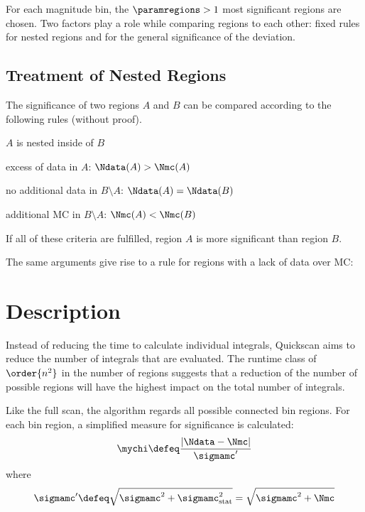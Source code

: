 For each magnitude bin, the $\paramregions > 1$ most significant regions are chosen. Two factors play a role while comparing regions to each other: fixed rules for nested regions and \mychi for the general significance of the deviation.

\subsection{Treatment of Nested Regions}
The significance of two regions $A$ and $B$ can be compared according to the following rules (without proof). 
\begin{my_list}
	\item $A$ is nested inside of $B$
	\item excess of data in $A$: $\Ndata(A) > \Nmc(A)$
	\item no additional data in $B \setminus A$: $\Ndata(A) = \Ndata(B)$
	\item additional MC in $B \setminus A$: $\Nmc(A) < \Nmc(B)$
\end{my_list}
If all of these criteria are fulfilled, region $A$ is more significant than region $B$.

The same arguments give rise to a rule for regions with a lack of data over MC:
\begin{my_list}
	
	
\end{my_list}



\section{Description}
Instead of reducing the time to calculate individual integrals, Quickscan aims to reduce the number of integrals that are evaluated. The runtime class of $\order{n^2}$ in the number of regions suggests that a reduction of the number of possible regions will have the highest impact on the total number of integrals.

Like the full scan, the algorithm regards all possible connected bin regions. For each bin region, a simplified measure for significance is calculated:
\begin{equation}
\mychi \defeq \frac{|\Ndata - \Nmc|}{\sigmamc'}
\end{equation}
where
\begin{equation}
\sigmamc' \defeq \sqrt{\sigmamc^2 + \sigmamc_{\mathrm{stat}}^2} = \sqrt{\sigmamc^2 + \Nmc}
\end{equation}

